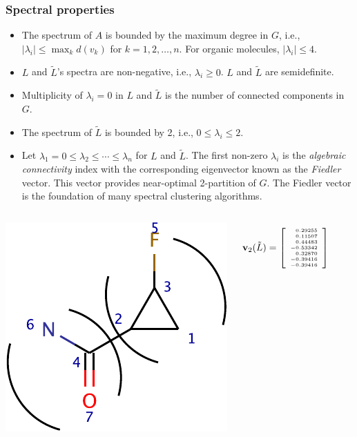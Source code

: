 \documentclass{beamer}
\begin{document}
\begin{frame}
  \frametitle{Spectral properties}
  \begin{itemize}
    \item The spectrum of $A$ is bounded by the maximum degree in $G$,
      i.e., $|\lambda_i| \leq \max_k d(v_k)$ for $k = 1, 2, \ldots,
      n$.  For organic molecules, $|\lambda_i| \leq 4$.
    \item $L$ and $\tilde L$'s spectra are non-negative, i.e., $\lambda_i
      \ge 0$. $L$ and $\tilde L$ are semidefinite.
    \item Multiplicity of $\lambda_i = 0$ in $L$ and $\tilde L$ is the
      number of connected components in $G$. 
    \item The spectrum of $\tilde L$ is bounded by 2, i.e., $0 \le
      \lambda_i \le 2$.
    \item Let $\lambda_1 = 0 \le \lambda_2 \le \cdots \le \lambda_n$ for
      $L$ and $\tilde L$. The first non-zero $\lambda_i$ is the
      \emph{algebraic connectivity} index with the corresponding 
      eigenvector known as the \emph{Fiedler} vector. This vector
      provides near-optimal 2-partition of $G$. The Fiedler vector
      is the foundation of many spectral clustering algorithms.
  \end{itemize}
  \begin{columns}
    \centerline{\includegraphics[width=.8 true in]{test0-part-crop}}
    \[
    \mathbf{v}_2(\tilde L) = \left[\tiny\begin{array}{r}
      0.29255\\
      0.11507\\
      0.44483\\
      -0.53342\\
      0.32870\\
      -0.39416\\
      -0.39416\\
      \end{array}\right]
    \]
  \end{columns}
\end{frame}
\end{document}
